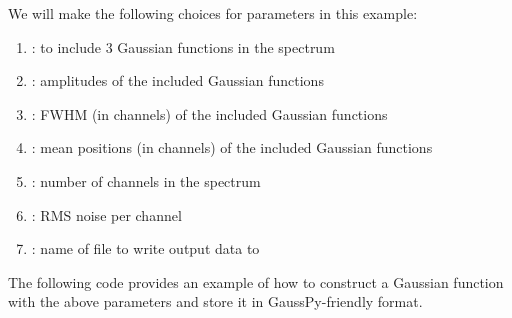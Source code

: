 \documentclass[letterpaper,10pt,openany,oneside]{sphinxmanual}
\begin{document}
We will make the following choices for parameters in this example:
\begin{enumerate}
\item {} 
 : to include 3 Gaussian functions in the spectrum

\item {} 
 : amplitudes of the included Gaussian functions

\item {} 
 : FWHM (in channels) of the included Gaussian functions

\item {} 
 : mean positions (in channels) of the included Gaussian functions

\item {} 
 : number of channels in the spectrum

\item {} 
 : RMS noise per channel

\item {} 
 : name of file to write output data to

\end{enumerate}

The following code provides an example of how to construct a Gaussian function
with the above parameters and store it in GaussPy-friendly format.
\end{document}

